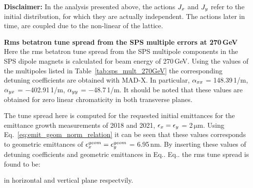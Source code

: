 \textbf{Disclaimer:} In the analysis presented above, the actions ${J_x}$ and ${J_y}$ refer to the initial distribution, for which they are actually independent. The actions later in time, are coupled due to the non-linear
of the lattice. %


\normalsize{\textbf{Rms betatron tune spread from the SPS multiple errors at 270\,GeV}}\\
Here the rms betatron tune spread from the SPS multipole components in the SPS dipole magnets is calculated for beam energy of 270\,GeV. Using the values of the multipoles listed in Table~\ref{tab:sps_mult_270GeV} the corresponding detuning coefficients are obtained with MAD-X. In particular, ${\alpha_{xx}}$ = 148.39\,1/m, ${\alpha_{yx}}$ = $-$402.91\,1/m, ${\alpha_{yy}}$ = $-$48.7\,1/m. It should be noted that these values are obtained for zero linear chromaticity in both transverse planes.

The tune spread here is computed for the requested initial emittances for the emittance growth measurements of 2018 and 2021, ${\epsilon_{x}} = {\epsilon_{y}}$ = 2\,$\mathrm{\mu m}$. Using Eq.~\eqref{eq:emit_geom_norm_relation} it can be seen that these values corresponds to geometric emittances of ${\epsilon_x^{geom}}={\epsilon_y^{geom}}$ = 6.95\,nm.
By inserting these values of detuning coefficients and geometric emittances in Eq.. Eq.. the rms tune spread is found to be:



in horizontal and vertical plane respectvily.

